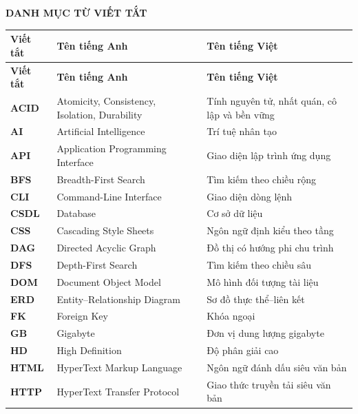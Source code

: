\documentclass[../DoAn.tex]{subfiles}
\begin{document}
{}
\begin{center}
    \textbf{\large DANH MỤC TỪ VIẾT TẮT}
\end{center}

\begingroup
\renewcommand{\arraystretch}{1.2}
\begin{longtable}{|>{\centering\arraybackslash}p{1.8cm}|p{5.6cm}|p{6.1cm}|}
    \hline
    \textbf{Viết tắt} & \textbf{Tên tiếng Anh} & \textbf{Tên tiếng Việt} \\ \hline
    \endfirsthead
    \hline
    \textbf{Viết tắt} & \textbf{Tên tiếng Anh} & \textbf{Tên tiếng Việt} \\ \hline
    \endhead

    \textbf{ACID} & Atomicity, Consistency, Isolation, Durability & Tính nguyên tử, nhất quán, cô lập và bền vững \\ \hline
    \textbf{AI} & Artificial Intelligence & Trí tuệ nhân tạo \\ \hline
    \textbf{API} & Application Programming Interface & Giao diện lập trình ứng dụng \\ \hline
    \textbf{BFS} & Breadth-First Search & Tìm kiếm theo chiều rộng \\ \hline
    \textbf{CLI} & Command-Line Interface & Giao diện dòng lệnh \\ \hline
    \textbf{CSDL} & Database & Cơ sở dữ liệu \\ \hline
    \textbf{CSS} & Cascading Style Sheets & Ngôn ngữ định kiểu theo tầng \\ \hline
    \textbf{DAG} & Directed Acyclic Graph & Đồ thị có hướng phi chu trình \\ \hline
    \textbf{DFS} & Depth-First Search & Tìm kiếm theo chiều sâu \\ \hline
    \textbf{DOM} & Document Object Model & Mô hình đối tượng tài liệu \\ \hline
    \textbf{ERD} & Entity--Relationship Diagram & Sơ đồ thực thể--liên kết \\ \hline
    \textbf{FK} & Foreign Key & Khóa ngoại \\ \hline
    \textbf{GB} & Gigabyte & Đơn vị dung lượng gigabyte \\ \hline
    \textbf{HD} & High Definition & Độ phân giải cao \\ \hline
    \textbf{HTML} & HyperText Markup Language & Ngôn ngữ đánh dấu siêu văn bản \\ \hline
    \textbf{HTTP} & HyperText Transfer Protocol & Giao thức truyền tải siêu văn bản \\ \hline

\end{longtable}
\end{document}
